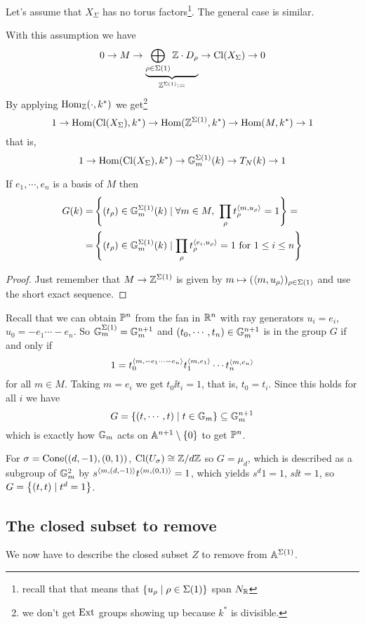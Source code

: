 Let's assume that $X_\Sigma$ has no torus factors\footnote{recall that that means that $\left\{{u_\rho\mid \rho\in \Sigma(1)}\right\}$ span $N_{\mathbb{R}}$}. The general case is similar.

With this assumption we have
\[0\to M\to \underset{\mathbb{Z}^{\Sigma(1)}:=}{\underbrace{\bigoplus_{\rho\in \Sigma(1)}\mathbb{Z}\cdot D_\rho}}\to \operatorname{Cl}(X_\Sigma)\to 0\]
By applying $\operatorname{Hom}_{\mathbb{Z}}(\cdot, k^\ast)$ we get\footnote{we don't get $\operatorname{Ext}$ groups showing up because $k^\ast$ is divisible.}
\[1\to \operatorname{Hom}(\operatorname{Cl}(X_\Sigma),k^\ast)\to \operatorname{Hom}(\mathbb{Z}^{\Sigma(1)},k^\ast)\to \operatorname{Hom}(M,k^\ast)\to 1\]
that is,
\[1\to \operatorname{Hom}(\operatorname{Cl}(X_\Sigma),k^\ast)\to \mathbb{G}_m^{\Sigma(1)}(k)\to T_N(k)\to 1\]
\begin{proposition}[]\label{PrComputeClosedPointsOfCartierDualOfClassGroup}
If $e_1,\cdots, e_n$ is a basis of $M$ then
\begin{align*}
G(k)=&\cpa{(t_\rho)\in \G_m^{\Sigma(1)}(k)\mid \forall m\in M,\ \prod_{\rho}t_\rho^{\ps{m,u_\rho}}=1}=\\
=&\cpa{(t_\rho)\in \G_m^{\Sigma(1)}(k)\mid \prod_{\rho}t_\rho^{\ps{e_i,u_\rho}}=1\text{ for }1\leq i\leq n}
\end{align*}
\end{proposition}
\begin{proof}
Just remember that $M\to \mathbb{Z}^{\Sigma(1)}$ is given by $m\mapsto (\left\langle {m,u_\rho}\right\rangle)_{\rho\in \Sigma(1)}$ and use the short exact sequence.
\end{proof}


\begin{example}
Recall that we can obtain $\mathbb{P}^n$ from the fan in $\mathbb{R}^n$ with ray generators $u_i=e_i$, $u_0=-e_1\cdots-e_n$. So $\mathbb{G}_m^{\Sigma(1)}=\mathbb{G}_m^{n+1}$ and $(t_0,\cdots, t_n)\in \mathbb{G}_m^{n+1}$ is in the group $G$ if and only if
\[1=t_0^{\left\langle {m,-e_1\cdots-e_n}\right\rangle}t_1^{\left\langle {m,e_1}\right\rangle}\cdots t_n^{\left\langle {m,e_n}\right\rangle}\]
for all $m\in M$. Taking $m=e_i$ we get $t_0\ii t_i=1$, that is, $t_0=t_i$. Since this holds for all $i$ we have
\[G=\left\{{(t,\cdots, t)\mid t\in \mathbb{G}_m}\right\}\subseteq \mathbb{G}_m^{n+1}\]
which is exactly how $\mathbb{G}_m$ acts on $\mathbb{A}^{n+1}\setminus\{0\}$ to get $\mathbb{P}^n$. 
\end{example}

\begin{example}
For $\sigma=\operatorname{Cone}((d,-1),(0,1))$, $\operatorname{Cl}(U_\sigma)\cong {\mathbb{Z}/{d}\mathbb{Z}}$ so $G=\mu_d$, which is described as a subgroup of $\mathbb{G}_m^2$ by $s^{\left\langle {m,(d,-1)}\right\rangle}t^{\left\langle {m,(0,1)}\right\rangle}=1$, which yields $s^d1=1$, $s\ii t=1$, so $G=\left\{{(t,t)\mid t^d=1}\right\}$.
\end{example}

\subsection{The closed subset to remove}
We now have to describe the closed subset $Z$ to remove from $\mathbb{A}^{\Sigma(1)}$.

